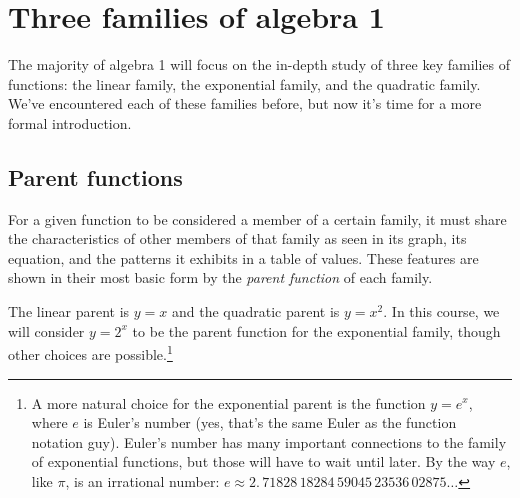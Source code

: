
\section{Three families of algebra 1}
\label{sec:threefamilies}

The majority of algebra 1 will focus on the in-depth study of three key families of functions: the linear family, the exponential family, and the quadratic family. We've encountered each of these families before, but now it's time for a more formal introduction.

\begin{boxedexplore}
\end{boxedexplore}

\subsection{Parent functions}

For a given function to be considered a member of a certain family, it must share the characteristics of other members of that family as seen in its graph, its equation, and the patterns it exhibits in a table of values. These features are shown in their most basic form by the \textit{parent function} of each family.

The linear parent is $y=x$ and the quadratic parent is $y=x^2$. In this course, we will consider $y=2^x$ to be the parent function for the exponential family, though other choices are possible.\footnote{A more natural choice for the exponential parent is the function $y=e^x$, where $e$ is Euler's number (yes, that's the same Euler as the function notation guy). Euler's number has many important connections to the family of exponential functions, but those will have to wait until later. By the way $e$, like $\pi$, is an irrational number: $e \approx 2.\, 71828\, 18284\, 59045\, 23536\, 02875\dotso$}

